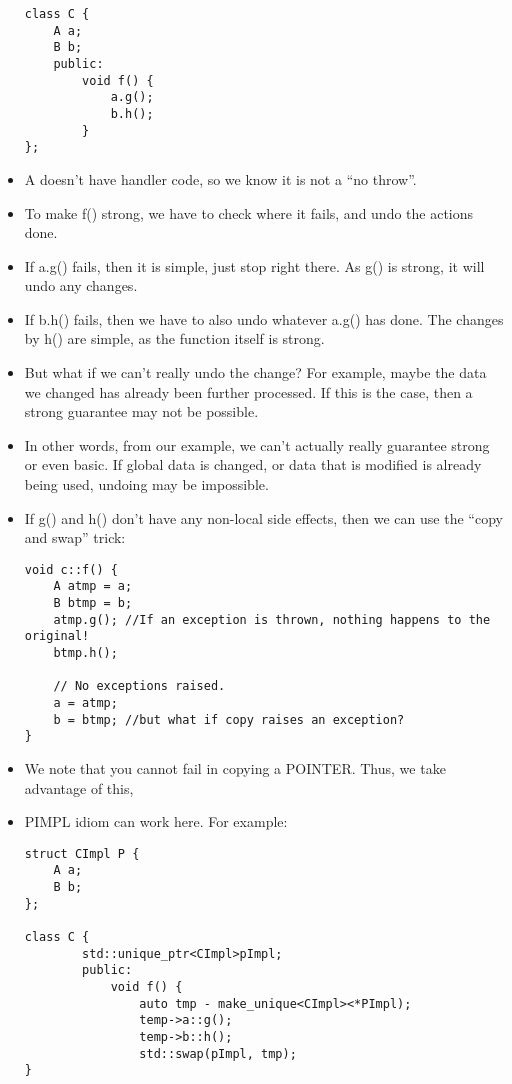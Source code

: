 \documentclass{article}
\begin{document}
\begin{itemize}
\begin{lstlisting}
class C {
    A a;
    B b;
    public:
        void f() {
            a.g();
            b.h();
        }
};
\end{lstlisting}
\item A doesn't have handler code, so we know it is not a ``no throw''.
\item To make f() strong, we have to check where it fails, and undo the actions done.
\item If a.g() fails, then it is simple, just stop right there.  As g() is strong, it will undo any changes.
\item If b.h() fails, then we have to also undo whatever a.g() has done.  The changes by h() are simple, as the function itself is strong.
\item But what if we can't really undo the change?  For example, maybe the data we changed has already been further processed.  If this is the case, then a strong guarantee may not be possible.
\item In other words, from our example, we can't actually really guarantee strong or even basic.  If global data is changed, or data that is modified is already being used, undoing may be impossible.
\item If g() and h() don't have any non-local side effects, then we can use the ``copy and swap'' trick:
\begin{lstlisting}
void c::f() {
    A atmp = a;
    B btmp = b;
    atmp.g(); //If an exception is thrown, nothing happens to the original!
    btmp.h();

    // No exceptions raised.
    a = atmp;
    b = btmp; //but what if copy raises an exception?
}
\end{lstlisting}
\item We note that you cannot fail in copying a POINTER.  Thus, we take advantage of this,
\item PIMPL idiom can work here.  For example:
\begin{lstlisting}
struct CImpl P {
    A a;
    B b;
};

class C {
        std::unique_ptr<CImpl>pImpl;
        public:
            void f() {
                auto tmp - make_unique<CImpl><*PImpl);
                temp->a::g();
                temp->b::h();
                std::swap(pImpl, tmp);
}
\end{lstlisting}
\end{itemize}
\end{document}

